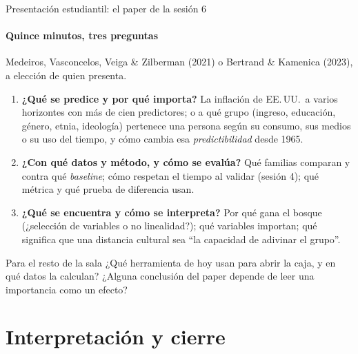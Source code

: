 \documentclass{beamer}
\newcommand{\1}{\mathbb{I}}
\begin{document}
\begin{frame}{Presentación estudiantil: el paper de la sesión 6}
\framesubtitle{Quince minutos, tres preguntas}
\small
Medeiros, Vasconcelos, Veiga \& Zilberman (2021) o Bertrand \& Kamenica (2023), a elección de quien presenta.
\begin{enumerate}\itemsep3pt
  \item \textbf{¿Qué se predice y por qué importa?} La inflación de EE.\,UU.\ a varios horizontes con más de cien predictores; o a qué grupo (ingreso, educación, género, etnia, ideología) pertenece una persona según su consumo, sus medios o su uso del tiempo, y cómo cambia esa \emph{predictibilidad} desde 1965.
  \item \textbf{¿Con qué datos y método, y cómo se evalúa?} Qué familias comparan y contra qué \emph{baseline}; cómo respetan el tiempo al validar (sesión 4); qué métrica y qué prueba de diferencia usan.
  \item \textbf{¿Qué se encuentra y cómo se interpreta?} Por qué gana el bosque (¿selección de variables o no linealidad?); qué variables importan; qué significa que una distancia cultural sea ``la capacidad de adivinar el grupo''.
\end{enumerate}
\pause
\begin{block}{Para el resto de la sala}
¿Qué herramienta de hoy usan para abrir la caja, y en qué datos la calculan? ¿Alguna conclusión del paper depende de leer una importancia como un efecto?
\end{block}
\end{frame}


\section{Interpretación y cierre}
\begin{frame}[noframenumbering]
\tableofcontents[currentsection]
\end{frame}
\end{document}

